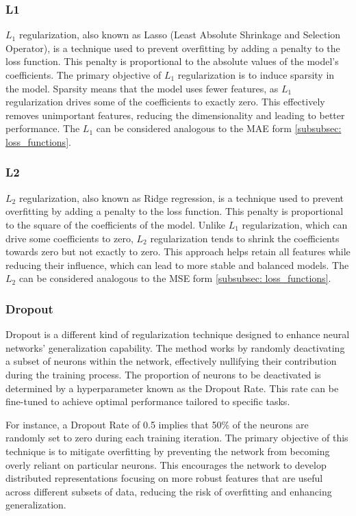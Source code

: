 \subsubsection{L1}
\(L_1\) regularization, also known as Lasso (Least Absolute Shrinkage and Selection Operator), is a technique used to prevent overfitting by adding a penalty to the loss function. This penalty is proportional to the absolute values of the model's coefficients. The primary objective of \(L_1\) regularization is to induce sparsity in the model. Sparsity means that the model uses fewer features, as \(L_1\) regularization drives some of the coefficients to exactly zero. This effectively removes unimportant features, reducing the dimensionality and leading to better performance. The \(L_1\) can be considered analogous to the MAE form \autoref{subsubsec: loss_functions}.

\subsubsection{L2}
\(L_2\) regularization, also known as Ridge regression, is a technique used to prevent overfitting by adding a penalty to the loss function. This penalty is proportional to the square of the coefficients of the model. Unlike \(L_1\) regularization, which can drive some coefficients to zero, \(L_2\) regularization tends to shrink the coefficients towards zero but not exactly to zero. This approach helps retain all features while reducing their influence, which can lead to more stable and balanced models. The \(L_2\) can be considered analogous to the MSE form \autoref{subsubsec: loss_functions}.

\subsubsection{Dropout}
Dropout is a different kind of regularization technique designed to enhance neural networks' generalization capability. The method works by randomly deactivating a subset of neurons within the network, effectively nullifying their contribution during the training process. The proportion of neurons to be deactivated is determined by a hyperparameter known as the Dropout Rate. This rate can be fine-tuned to achieve optimal performance tailored to specific tasks. 

For instance, a Dropout Rate of 0.5 implies that 50\% of the neurons are randomly set to zero during each training iteration. The primary objective of this technique is to mitigate overfitting by preventing the network from becoming overly reliant on particular neurons. This encourages the network to develop distributed representations focusing on more robust features that are useful across different subsets of data, reducing the risk of overfitting and enhancing generalization.

